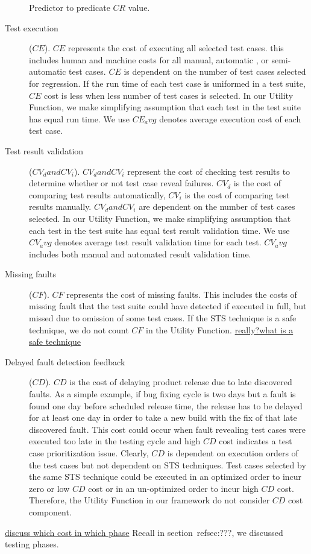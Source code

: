\begin{description}
Predictor to predicate $CR$ value.
\item[Test execution]($CE$). $CE$ represents the cost of executing
all selected test cases. this includes human and machine costs for all manual,
automatic , or semi-automatic test cases. $CE$ is dependent on the number
of test cases selected for regression. If the run time of each test case is
uniformed in a test suite, $CE$ cost is less when less number of
test cases is selected. In our Utility Function, we make simplifying assumption
that each test in the test suite has equal run time. We use $CE_avg$
denotes average execution cost of each test case. 
\item[Test result validation]($CV_d and CV_i$). $CV_d and CV_i$ represent the
cost of checking test results to determine whether or not test case reveal failures. $CV_d$ is the cost of comparing test results
automatically, $CV_i$ is the cost of comparing test results
manually. $CV_d and CV_i$ are dependent on the number of test cases
selected. In our Utility Function, we make simplifying assumption that each test
in the test suite has equal test result validation time. We use $CV_avg$
denotes average test result validation time for each test. $CV_avg$
includes both manual and automated result validation time.
\item[Missing faults]($CF$). $CF$ represents the cost of missing
faults. This includes the costs of missing fault that the test suite could have
detected if executed in full, but missed due to omission of some test cases. If
the STS technique is a safe technique, we do not count $CF$ in the
Utility Function. \underline{really?what is a safe technique}
\item[Delayed fault detection feedback]($CD$). $CD$ is the cost
of delaying product release due to late discovered faults. As a simple example,
if bug fixing cycle is two days but a fault is found one day before scheduled
release time, the release has to be delayed for at least one day in order to
take a new build with the fix of that late discovered fault. This cost could occur
when fault revealing test cases were executed too late in the testing cycle and
high $CD$ cost indicates a test case prioritization issue. Clearly,
$CD$ is dependent on execution orders of the test cases but not dependent
on STS techniques. Test cases selected by the same STS technique could be
executed in an optimized order to incur zero or low $CD$ cost or in an
un-optimized order to incur high $CD$ cost. Therefore, the Utility
Function in our framework do not consider $CD$ cost component.
\end{description}
\underline{discuss which cost in which phase} Recall in section~ref{sec:???}, we
discussed testing phases. 

